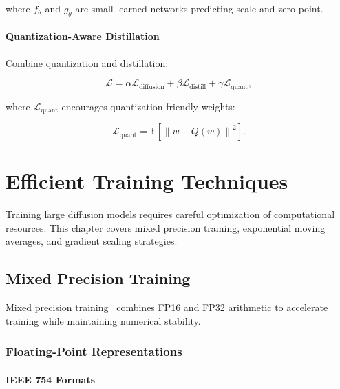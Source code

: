 \documentclass[12pt]{report}
\theoremstyle{definition}
\newcommand{\E}{\mathbb{E}}
\newcommand{\loss}{\mathcal{L}}
\newcommand{\norm}[1]{\left\| #1 \right\|}
\begin{document}
where $f_\theta$ and $g_\theta$ are small learned networks predicting scale and zero-point.

\subsubsection{Quantization-Aware Distillation}

Combine quantization and distillation:

\begin{equation}
\loss = \alpha \loss_{\text{diffusion}} + \beta \loss_{\text{distill}} + \gamma \loss_{\text{quant}},
\label{eq:quant_distill_loss}
\end{equation}

where $\loss_{\text{quant}}$ encourages quantization-friendly weights:

\begin{equation}
\loss_{\text{quant}} = \E\left[\norm{w - Q(w)}^2\right].
\label{eq:quant_regularizer}
\end{equation}

\chapter{Efficient Training Techniques}

Training large diffusion models requires careful optimization of computational resources. This chapter covers mixed precision training, exponential moving averages, and gradient scaling strategies.

\section{Mixed Precision Training}

Mixed precision training~\citep{micikevicius2017mixed} combines FP16 and FP32 arithmetic to accelerate training while maintaining numerical stability.

\subsection{Floating-Point Representations}

\subsubsection{IEEE 754 Formats}
\end{document}
